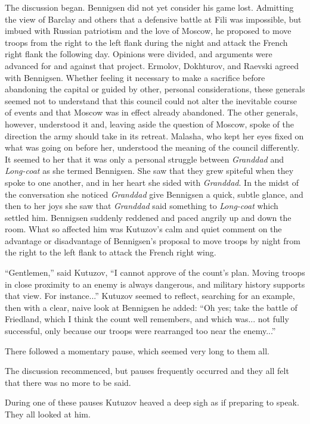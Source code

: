 The discussion began. Bennigsen did not yet consider his game
lost.  Admitting the view of Barclay and others that a defensive
battle at Fili was impossible, but imbued with Russian patriotism
and the love of Moscow, he proposed to move troops from the right
to the left flank during the night and attack the French right
flank the following day.  Opinions were divided, and arguments
were advanced for and against that project. Ermolov, Dokhturov,
and Raevski agreed with Bennigsen. Whether feeling it necessary
to make a sacrifice before abandoning the capital or guided by
other, personal considerations, these generals seemed not to
understand that this council could not alter the inevitable
course of events and that Moscow was in effect already
abandoned. The other generals, however, understood it and,
leaving aside the question of Moscow, spoke of the direction the
army should take in its retreat.  Malasha, who kept her eyes
fixed on what was going on before her, understood the meaning of
the council differently. It seemed to her that it was only a
personal struggle between \emph{Granddad} and \emph{Long-coat} as
she termed Bennigsen. She saw that they grew spiteful when they
spoke to one another, and in her heart she sided with
\emph{Granddad}. In the midst of the conversation she noticed
\emph{Granddad} give Bennigsen a quick, subtle glance, and then
to her joys she saw that \emph{Granddad} said something to
\emph{Long-coat} which settled him. Bennigsen suddenly reddened
and paced angrily up and down the room. What so affected him was
Kutuzov's calm and quiet comment on the advantage or disadvantage
of Bennigsen's proposal to move troops by night from the right to
the left flank to attack the French right wing.

``Gentlemen,'' said Kutuzov, ``I cannot approve of the count's
plan. Moving troops in close proximity to an enemy is always
dangerous, and military history supports that view. For
instance...'' Kutuzov seemed to reflect, searching for an
example, then with a clear, naive look at Bennigsen he added:
``Oh yes; take the battle of Friedland, which I think the count
well remembers, and which was... not fully successful, only
because our troops were rearranged too near the enemy...''

There followed a momentary pause, which seemed very long to them
all.

The discussion recommenced, but pauses frequently occurred and
they all felt that there was no more to be said.

During one of these pauses Kutuzov heaved a deep sigh as if
preparing to speak. They all looked at him.

